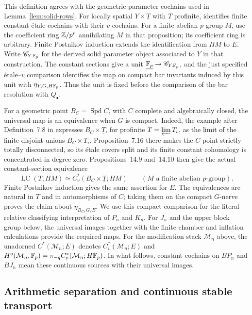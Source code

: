 This definition agrees with the geometric parameter cochains used in
Lemma~\ref{lem:solid-rows}.
For locally spatial $Y\times\underline T$ with $T$ profinite,
\cite[Proposition~14.10]{ScholzeDiamonds} identifies finite constant
\'{e}tale cochains with their $v$-cochains.  For a finite abelian
$p$-group $M$, use the coefficient ring $\mathbb Z/p^r$ annihilating $M$ in
that proposition; its coefficient ring is arbitrary.  Finite Postnikov
induction extends the identification from $HM$ to $E$.  Write
$\mathscr C_{Y,\mathbb F_p}$ for the derived solid parameter object associated
to $Y$ in that construction.  The constant sections give a unit
$\underline{\mathbb F_p}\to\mathscr C_{Y,\mathbb F_p}$, and the just specified
\'{e}tale--$v$ comparison identifies the map on compact bar invariants
induced by this unit with $\eta_{Y,G,H\mathbb F_p}$.  Thus the unit is fixed
before the comparison of the bar resolution with $Q_\bullet$.

For a geometric point $B_C=\operatorname{Spd}C$, with $C$ complete and
algebraically closed, the universal map is an equivalence when $G$ is
compact.  Indeed, the example after Definition~7.8 in
\cite{ScholzeDiamonds} expresses $B_C\times\underline T$, for profinite
$T=\varprojlim T_i$, as the limit of the finite disjoint unions
$B_C\times T_i$.  Proposition~7.16 there makes the $C$ point strictly
totally disconnected, so its \'{e}tale covers split and its finite
constant cohomology is concentrated in degree zero.  Propositions~14.9
and~14.10 then give the actual constant-section equivalence
\[
 \operatorname{LC}(T;HM)
    \simeq C_v^*(B_C\times\underline T;HM)
 \qquad(M\text{ a finite abelian }p\text{-group}).
\]
Finite Postnikov induction gives the same assertion for $E$.  The
equivalences are natural in $T$ and in automorphisms of $C$; taking them
on the compact $G$-nerve proves the claim about
$\eta_{B_C,G,E}$.  We use this compact comparison for the literal
relative classifying interpretation of $P_n$ and $K_n$.  For $J_n$ and
the upper block group below, the universal images together with the
finite chamber and inflation calculations provide the required maps.
For the modification stack $\mathcal M_n$ above, the unadorned
$C^*(\mathcal M_n;E)$ denotes $C_v^*(\mathcal M_n;E)$ and
$H^q(\mathcal M_n,\mathbb F_p)=\pi_{-q}C_v^*(\mathcal M_n;H\mathbb F_p)$.
In what follows, constant cochains on $BP_n$ and $BJ_n$ mean these
continuous sources with their universal images.

\subsection{Arithmetic separation and continuous stable transport}

